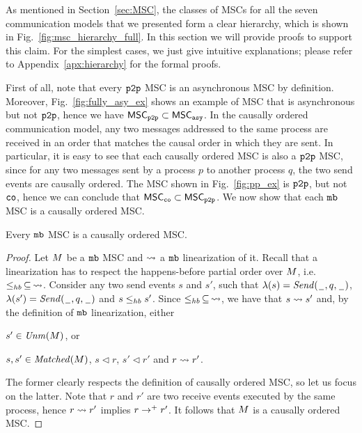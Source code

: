 
As mentioned in Section~\ref{sec:MSC}, the classes of MSCs for all the seven communication models that we presented form a clear hierarchy, which is shown in Fig.~\ref{fig:msc_hierarchy_full}. In this section we will provide proofs to support this claim. For the simplest cases, we just give intuitive explanations; please refer to Appendix~\ref{apx:hierarchy} for the formal proofs.

\medskip

First of all, note that every $\mathtt{p2p}$ MSC is an asynchronous MSC by definition. Moreover, Fig.~\ref{fig:fully_asy_ex} shows an example of MSC that is asynchronous but not $\mathtt{p2p}$, hence we have $\mathsf{MSC}_{\mathtt{p2p}} \subset \mathsf{MSC}_{\mathtt{asy}}$. 
In the causally ordered communication model, any two messages addressed to the same process are received in an order that matches the causal order in which they are sent. In particular, it is easy to see that each causally ordered MSC is also a $\mathtt{p2p}$ MSC, since for any two messages sent by a process $p$ to another process $q$, the two send events are causally ordered. The MSC shown in Fig.~\ref{fig:pp_ex} is $\mathtt{p2p}$, but not $\mathtt{co}$, hence we can conclude that $\mathsf{MSC}_{\mathtt{co}} \subset \mathsf{MSC}_{\mathtt{p2p}}$.
We now show that each $\mathtt{mb}$ MSC is a causally ordered MSC.

\begin{proposition} \label{prop:mb_is_co}
	Every $\mathtt{mb}$ MSC is a causally ordered MSC.
\end{proposition}
\begin{proof}
Let $M$ be a $\mathtt{mb}$ MSC and $\rightsquigarrow$ a $\mathtt{mb}$ linearization of it. Recall that a linearization has to respect the happens-before partial order over $M$, i.e. $\leq_{hb}\,\subseteq\, \rightsquigarrow$. Consider any two send events $s$ and $s'$, such that $\lambda(s)={\mathit{Send}(\hspace{0.1em}\underline{\hspace{0.5em}}\hspace{0.1em},q,\hspace{0.1em}\underline{\hspace{0.5em}}\hspace{0.1em})}$, $\lambda(s')={\mathit{Send}(\hspace{0.1em}\underline{\hspace{0.5em}}\hspace{0.1em},q,\hspace{0.1em}\underline{\hspace{0.5em}}\hspace{0.1em})}$ and $s \leq_{hb} s'$. Since $\leq_{hb}\,\subseteq\, \rightsquigarrow$, we have that $s \rightsquigarrow s'$ and, by the definition of $\mathtt{mb}$ linearization, either
\begin{enumerate*}[label={(\roman*)}]
	\item $s' \in \mathit{Unm}(M)$, or 
	\item $s,s' \in \mathit{Matched}(M)$, $s \lhd r$, $s' \lhd r'$ and $r \rightsquigarrow r'$. 
\end{enumerate*}
The former clearly respects the definition of causally ordered MSC, so let us focus on the latter. Note that $r$ and $r'$ are two receive events executed by the same process, hence $r \rightsquigarrow r'$ implies $r \to^+ r'$. It follows that $M$ is a causally ordered MSC.
\end{proof}

